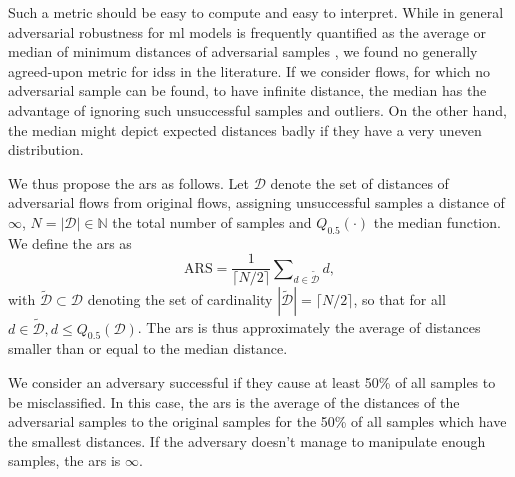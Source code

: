 \documentclass[conference]{IEEEtran}
\begin{document}
Such a metric should be easy to compute and easy to interpret.
While in general adversarial robustness for \gls{ml} models is frequently quantified as the average or median of minimum distances of adversarial samples \cite{carlini_evaluating_2019}, we found no generally agreed-upon metric for \glspl{ids} in the literature. If we consider flows, for which no adversarial sample can be found, to have infinite distance, the median has the advantage of ignoring such unsuccessful samples and outliers. On the other hand, the median might depict expected distances badly if they have a very uneven distribution. 

We thus propose the \gls{ars} as follows. Let $\mathcal D$ denote the set of distances of adversarial flows from original flows, assigning unsuccessful samples a distance of $\infty$, $N = | \mathcal D | \in \mathbb N$ the total number of samples and $Q_{0.5}(\cdot)$ the median function.
We define the \gls{ars} as 
\begin{equation}
\text{ARS} = \frac{1}{\lceil N/2 \rceil} \sum\nolimits_{d \in \tilde {\mathcal D}} d,
\end{equation}
with $\tilde {\mathcal D} \subset \mathcal D$ denoting the set of cardinality $|\tilde {\mathcal D}| =\lceil N/2 \rceil$, so that for all $d \in  \tilde {\mathcal D}, d \le Q_{0.5}(\mathcal D)$.
The \gls{ars} is thus approximately the average of distances smaller than or equal to the median distance.

We consider an adversary successful if they cause at least 50\% of all samples to be misclassified. In this case, the \gls{ars} is the average of the distances of the adversarial samples to the original samples for the 50\% of all samples which have the smallest distances. If the adversary doesn't manage to manipulate enough samples, the \gls{ars} is $\infty$.
\end{document}
